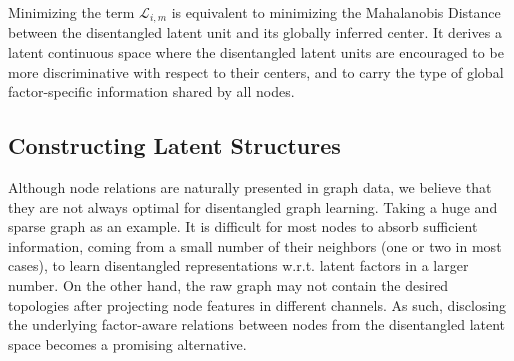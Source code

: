 \documentclass[accepted]{uai2021} %
\begin{document}
Minimizing the term $\mathcal{L}_{i,m}$ is equivalent to minimizing the Mahalanobis Distance~\citep{de2000mahalanobis} between the disentangled latent unit and its globally inferred center. It derives a latent continuous space where the disentangled latent units are encouraged to be more discriminative with respect to their centers, and to carry the type of global factor-specific information shared by all nodes.


\subsection{Constructing Latent Structures} \label{sec:geo_struc}
Although node relations are naturally presented in graph data, we believe that they are not always optimal for disentangled graph learning. Taking a huge and sparse graph as an example. It is difficult for most nodes to absorb sufficient information, coming from a small number of their neighbors (one or two in most cases), to learn disentangled representations w.r.t. latent factors in a larger number. On the other hand, the raw graph may not contain the desired topologies after projecting node features in different channels. As such, disclosing the underlying factor-aware relations between nodes from the disentangled latent space becomes a promising alternative.
\end{document}
